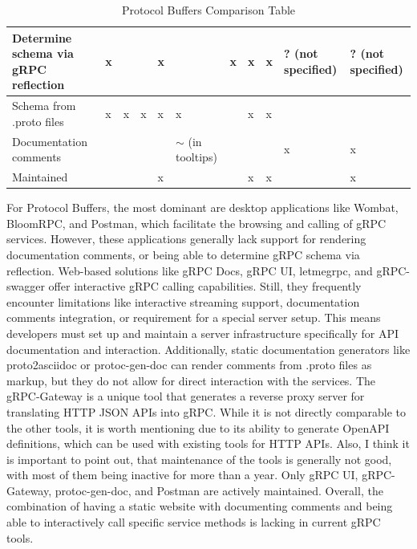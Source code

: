 \begin{landscape}
\begin{table}[]
{\begin{tabular}{|l|l|l|l|l|l|l|l|l|l|l|}
                Determine schema via gRPC reflection & x               &                   &                    & x                &                      & x                     & x                     & x                & ? (not specified)       & ? (not specified)       \\ \hline
                Schema from .proto files             & x               & x                 & x                  & x                & x                    &                       & x                     & x                &                         &                         \\ \hline
                Documentation comments               &                 &                   &                    &                  & $\sim$ (in tooltips) &                       &                       &                  & x                       & x                       \\ \hline
                Maintained                           &                 &                   &                    & x                &                      &                       & x                     & x                &                         & x                       \\ \hline
            \end{tabular}%
        }
        \caption{Protocol Buffers Comparison Table}
        \label{tab:grpc-comparison-table}
    \end{table}
\end{landscape}

For Protocol Buffers, the most dominant are desktop applications like Wombat, BloomRPC, and Postman, which facilitate the browsing and calling of gRPC services.
However, these applications generally lack support for rendering documentation comments, or being able to determine gRPC schema via reflection.
Web-based solutions like gRPC Docs, gRPC UI, letmegrpc, and gRPC-swagger offer interactive gRPC calling capabilities.
Still, they frequently encounter limitations like interactive streaming support, documentation comments integration, or requirement for a special server setup.
This means developers must set up and maintain a server infrastructure specifically for API documentation and interaction.
Additionally, static documentation generators like proto2asciidoc or protoc-gen-doc can render comments from .proto files as markup, but they do not allow for direct interaction with the services.
The gRPC-Gateway is a unique tool that generates a reverse proxy server for translating HTTP JSON APIs into gRPC\@.
While it is not directly comparable to the other tools, it is worth mentioning due to its ability to generate OpenAPI definitions, which can be used with existing tools for HTTP APIs.
Also, I think it is important to point out, that maintenance of the tools is generally not good, with most of them being inactive for more than a year.
Only gRPC UI, gRPC-Gateway, protoc-gen-doc, and Postman are actively maintained.
Overall, the combination of having a static website with documenting comments and being able to interactively call specific service methods is lacking in current gRPC tools.

